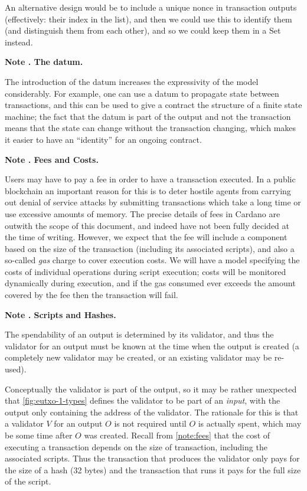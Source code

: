 \documentclass[a4paper]{article}
\newcounter{note}
\newcommand{\note}[1]{
  \bigskip
  \refstepcounter{note}
  \noindent\textbf{Note \thenote. #1}
}
\newcommand{\s}{\textsf}  %
\begin{document}
\noindent An alternative design would be to include a unique nonce in transaction outputs
(effectively: their index in the list), and then we could use this to identify
them (and distinguish them from each other), and so we could keep them in a \s{Set} instead.

\note{The datum.}
\label{note:datum}
The introduction of the datum
increases the expressivity of the model considerably. For example,
one can use a datum to propagate state between
transactions, and this can be used to give a contract the structure
of a finite state machine; the fact that the datum is part
of the output and not the transaction means that the state can
change without the transaction changing, which makes it easier to
have an ``identity'' for an ongoing contract.

\note{Fees and Costs.}
\label{note:fees}
Users may have to pay a fee in order to have a transaction executed.
In a public blockchain an important reason for this is to deter
hostile agents from carrying out denial of service attacks by
submitting transactions which take a long time or use excessive
amounts of memory.  The precise details of fees in Cardano are outwith
the scope of this document, and indeed have not been fully decided at
the time of writing. However, we expect that the fee will include a
component based on the size of the transaction (including its
associated scripts), and also a so-called \textit{gas} charge to cover
execution costs.  We will have a model specifying the costs of
individual operations during script execution; costs will be monitored
dynamically during execution, and if the gas consumed ever exceeds the
amount covered by the fee then the transaction will fail.

\note{Scripts and Hashes.}
\label{note:scripts} The spendability of an output is determined by
its validator, and thus the validator for an output must be
known at the time when the output is created (a completely new validator
may be created, or an existing validator may be re-used).

Conceptually the validator is part of the output, so it may be rather
unexpected that \cref{fig:eutxo-1-types} defines the validator
to be part of an \textit{input}, with the output only containing the
address of the validator.  The rationale for this is that a validator
$V$ for an output $O$ is not required until $O$ is actually spent,
which may be some time after $O$ was created. Recall from
\cref{note:fees} that the cost of executing a transaction depends
on the size of transaction, including the associated scripts.  Thus
the transaction that produces the validator only pays for the size of
a hash (32 bytes) and the transaction that runs it pays for the full
size of the script.
\end{document}
